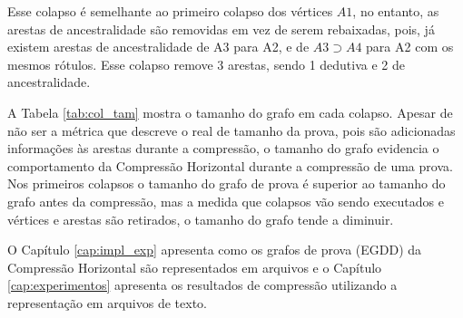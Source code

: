 \noindent Esse colapso é semelhante ao primeiro colapso dos vértices $A1$, no entanto, as arestas de ancestralidade são removidas em vez de serem rebaixadas, pois, já existem arestas de ancestralidade de A3 para A2, e de $A3 \supset A4$ para A2 com os mesmos rótulos. Esse colapso remove 3 arestas, sendo 1 dedutiva e 2 de ancestralidade.

\begin{center}
\end{center}

A Tabela \ref{tab:col_tam} mostra o tamanho do grafo em cada colapso. Apesar de não ser a métrica que descreve o real de tamanho da prova, pois são adicionadas informações às arestas durante a compressão, o tamanho do grafo evidencia o comportamento da Compressão Horizontal durante a compressão de uma prova. Nos primeiros colapsos o tamanho do grafo de prova é superior ao tamanho do grafo antes da compressão, mas a medida que colapsos vão sendo executados e vértices e arestas são retirados, o tamanho do grafo tende a diminuir. 



O Capítulo \ref{cap:impl_exp} apresenta como os grafos de prova (EGDD) da Compressão Horizontal são representados em arquivos e o Capítulo \ref{cap:experimentos} apresenta os resultados de compressão utilizando a representação em arquivos de texto.